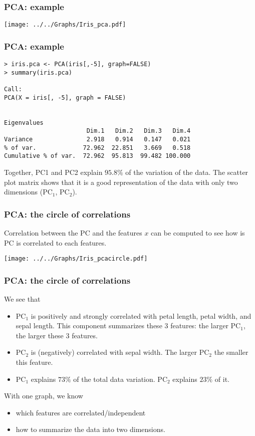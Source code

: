 \begin{frame}
\frametitle{PCA: example}
\begin{center}
\texttt{[image: ../../Graphs/Iris\_pca.pdf]}
\end{center}
\end{frame}
\begin{frame}[fragile]
\frametitle{PCA: example}
\scriptsize
\begin{verbatim}
> iris.pca <- PCA(iris[,-5], graph=FALSE) 
> summary(iris.pca)

Call:
PCA(X = iris[, -5], graph = FALSE) 


Eigenvalues
                       Dim.1   Dim.2   Dim.3   Dim.4
Variance               2.918   0.914   0.147   0.021
% of var.             72.962  22.851   3.669   0.518
Cumulative % of var.  72.962  95.813  99.482 100.000
\end{verbatim}
\normalsize
Together, PC1 and PC2 explain $95.8\%$ of the variation of the data. The scatter plot matrix shows that it is a good representation of the data with only two dimensions (PC$_1$, PC$_2$).
\end{frame}
\begin{frame}
\frametitle{PCA: the circle of correlations}
Correlation between the PC and the features $x$ can be computed to see how is PC is correlated to each features.
\begin{center}
\texttt{[image: ../../Graphs/Iris\_pcacircle.pdf]}
\end{center}
\end{frame}
\begin{frame}
\frametitle{PCA: the circle of correlations}
We see that
\begin{itemize}
\item PC$_1$ is positively and strongly correlated with petal length, petal width, and sepal length. This component summarizes these 3 features: the larger PC$_1$, the larger these 3 features.
\item PC$_2$ is (negatively) correlated with sepal width. The larger PC$_2$ the smaller this feature.
\item PC$_1$ explains $73\%$ of the total data variation. PC$_2$ explains $23\%$ of it.
\end{itemize}
With one graph, we know 
\begin{itemize}
\item which features are correlated/independent
\item how to summarize the data into two dimensions. 
\end{itemize}
\end{frame}
